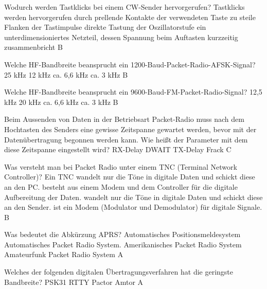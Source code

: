 {Wodurch werden Tastklicks bei einem CW-Sender hervorgerufen? Tastklicks werden hervorgerufen durch}%
{prellende Kontakte der verwendeten Taste}%
{zu steile Flanken der Tastimpulse}%
{direkte Tastung der Oszillatorstufe}%
{ein unterdimensioniertes Netzteil, dessen Spannung beim Auftasten kurzzeitig zusammenbricht}%
{B}%

{Welche HF-Bandbreite beansprucht ein 1200-Baud-Packet-Radio-AFSK-Signal?}%
{25 kHz}%
{12 kHz}%
{ca. 6,6 kHz}%
{ca. 3 kHz}%
{B}%

{Welche HF-Bandbreite beansprucht ein 9600-Baud-FM-Packet-Radio-Signal?}%
{12,5 kHz}%
{20 kHz}%
{ca. 6,6 kHz}%
{ca. 3 kHz}%
{B}%

{Beim Aussenden von Daten in der Betriebsart Packet-Radio muss nach dem Hochtasten des Senders eine gewisse Zeitspanne gewartet werden, bevor mit der Datenübertragung begonnen werden kann. Wie heißt der Parameter mit dem diese Zeitspanne eingestellt wird?}%
{RX-Delay}%
{DWAIT}%
{TX-Delay}%
{Frack}%
{C}%

{Was versteht man bei Packet Radio unter einem TNC (Terminal Network Controller)? Ein TNC}%
{wandelt nur die Töne in digitale Daten und schickt diese an den PC.}%
{besteht aus einem Modem und dem Controller für die digitale Aufbereitung der Daten.}%
{wandelt nur die Töne in digitale Daten und schickt diese an den Sender.}%
{ist ein Modem (Modulator und Demodulator) für digitale Signale.}%
{B}%


{Was bedeutet die Abkürzung APRS?}%
{Automatisches Positionsmeldesystem}%
{Automatisches Packet Radio System.}%
{Amerikanisches Packet Radio System}%
{Amateurfunk Packet Radio System}%
{A}%

{Welches der folgenden digitalen Übertragungsverfahren hat die geringste Bandbreite?}%
{PSK31}%
{RTTY}%
{Pactor}%
{Amtor}%
{A}%
